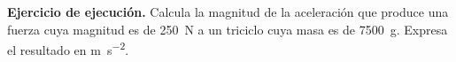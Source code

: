 \documentclass[12pt, letter]{exam}
\begin{document}
\begin{questions}

    \question \label{Ejercicio_10} \textbf{Ejercicio de ejecución.} Calcula la magnitud de la aceleración que produce una fuerza cuya magnitud es de \SI{250}{\newton} a un triciclo cuya masa es de \SI{7500}{\gram}. Expresa el resultado en \unit{\meter\per\square\second}.
    

\end{questions}
\end{document}

